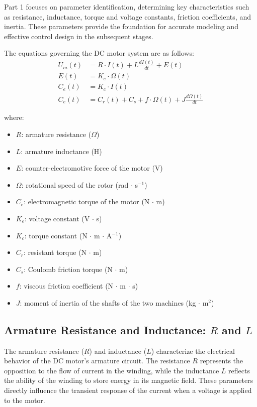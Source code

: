 \documentclass{rapportCS}
\begin{document}
Part 1 focuses on parameter identification, determining key characteristics such as resistance, inductance, torque and voltage constants, friction coefficients, and inertia. These parameters provide the foundation for accurate modeling and effective control design in the subsequent stages.

\vspace{1em}
\noindent The equations governing the DC motor system are as follows:
\begin{align}
U_m(t) &= R \cdot I(t) + L \frac{dI(t)}{dt} + E(t) \label{eq:voltage} \\
E(t) &= K_e \cdot \Omega(t) \label{eq:bemf} \\
C_e(t) &= K_c \cdot I(t) \label{eq:torque} \\
C_e(t) &= C_r(t) + C_s + f \cdot \Omega(t) + J \frac{d\Omega(t)}{dt} \label{eq:mechanical}
\end{align}

\noindent where:
\begin{itemize}
    \item $R$: armature resistance ($\Omega$)
    \item $L$: armature inductance (H)
    \item $E$: counter-electromotive force of the motor (V)
    \item $\Omega$: rotational speed of the rotor (rad $\cdot$ s$^{-1}$)
    \item $C_e$: electromagnetic torque of the motor (N $\cdot$ m)
    \item $K_e$: voltage constant (V $\cdot$ s)
    \item $K_c$: torque constant (N $\cdot$ m $\cdot$ A$^{-1}$)
    \item $C_r$: resistant torque (N $\cdot$ m)
    \item $C_s$: Coulomb friction torque (N $\cdot$ m)
    \item $f$: viscous friction coefficient (N $\cdot$ m $\cdot$ s)
    \item $J$: moment of inertia of the shafts of the two machines (kg $\cdot$ m$^2$)
\end{itemize}

\subsection{Armature Resistance and Inductance: $R$ and $L$}

The armature resistance ($R$) and inductance ($L$) characterize the electrical behavior of the DC motor’s armature circuit. The resistance $R$ represents the opposition to the flow of current in the winding, while the inductance $L$ reflects the ability of the winding to store energy in its magnetic field. These parameters directly influence the transient response of the current when a voltage is applied to the motor.
\end{document}

